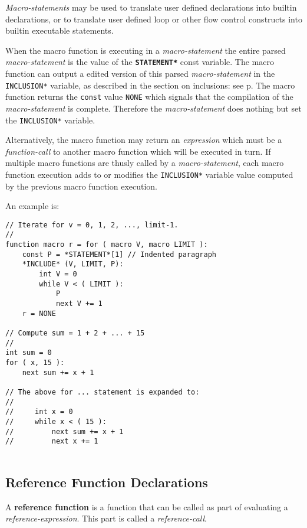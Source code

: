 \documentclass[12pt]{article}
\newcommand{\key}[1]{{\rm \bfseries #1}}
\newcommand{\ttkey}[1]{{\tt \bfseries #1}}
\newcommand{\pagref}[1]{p\pageref{#1}}
\newenvironment{indpar}[1][0.3in]%
	{\begin{list}{}%
		     {\setlength{\itemsep}{0in}%
		      \setlength{\topsep}{0in}%
		      \setlength{\parsep}{1ex}%
		      \setlength{\labelwidth}{#1}%
		      \setlength{\leftmargin}{#1}%
		      \addtolength{\leftmargin}{\labelsep}}%
	 \item}%
	{\end{list}}
\begin{document}
{\em Macro-statements} may be used to translate user defined declarations
into builtin declarations, or to translate user defined loop or
other flow control constructs into builtin executable statements.

When the macro function is executing in a {\em macro-statement}
the entire parsed {\em macro-state\-ment} is the value of the
\ttkey{*STATEMENT*} const variable.  The macro function can
output a edited version of this parsed {\em macro-statement}
in the {\tt *INCLUSION*} variable, as described in
the section on inclusions: see \pagref{INCLUSIONS}.
The macro function returns the {\tt const} value {\tt NONE}
which signals that the compilation of the {\em macro-statement}
is complete.  Therefore the {\em macro-statement} does nothing
but set the {\tt *INCLUSION*} variable.

Alternatively,
the macro function may return an {\em expression}
which must be a {\em function-call} to another macro function which
will be executed in turn.
If multiple macro functions are thusly called by a {\em macro-statement},
each macro function execution adds to or modifies
the {\tt *INCLUSION*} variable
value computed  by the previous macro function execution.

An example is:
\begin{indpar}[1em]\begin{verbatim}
// Iterate for v = 0, 1, 2, ..., limit-1.
//
function macro r = for ( macro V, macro LIMIT ):
    const P = *STATEMENT*[1] // Indented paragraph
    *INCLUDE* (V, LIMIT, P):
        int V = 0
        while V < ( LIMIT ):
            P
            next V += 1
    r = NONE

// Compute sum = 1 + 2 + ... + 15
//
int sum = 0
for ( x, 15 ):
    next sum += x + 1

// The above for ... statement is expanded to:
//
//     int x = 0
//     while x < ( 15 ):
//         next sum += x + 1
//         next x += 1
    
\end{verbatim}\end{indpar}


\subsection{Reference Function Declarations}
\label{REFERENCE-FUNCTION-DECLARATIONS}

A \key{reference function} is a function that can be
called as part of evaluating a {\em reference-expression}.
This part is called a {\em reference-call}\label{REFERENCE-CALL}.
\end{document}
